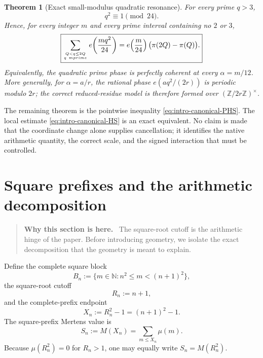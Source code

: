 \documentclass[11pt]{article}
\newtheorem{theorem}{Theorem}[section]
\theoremstyle{definition}
\theoremstyle{remark}
\newcommand{\1}{\mathbf{1}}
\newcommand{\N}{\mathbb{N}}
\newenvironment{motivation}
  {\begin{quote}\small\color{ovvogray}\textbf{Why this section is here.}\ }
  {\end{quote}}
\begin{document}
\begin{theorem}[Exact small-modulus quadratic resonance]
\label{thm:intro-prime-square-24}
For every prime $q>3$,
\[
 \boxed{q^2\equiv1\pmod{24}.}
\]
Hence, for every integer $m$ and every prime interval containing no $2$ or $3$,
\[
 \boxed{
 \sum_{Q<q\le2Q\atop q\ {
m prime}}
 e\!\left(\frac{m q^2}{24}\right)
 =e\!\left(\frac m{24}\right)
 \bigl(\pi(2Q)-\pi(Q)\bigr).
 }
\]
Equivalently, the quadratic prime phase is perfectly coherent at every
$\alpha=m/12$.  More generally, for $\alpha=a/r$, the rational phase
$e(aq^2/(2r))$ is periodic modulo $2r$; the correct reduced-residue model is therefore formed over $(\mathbb Z/2r\mathbb Z)^\times$.
\end{theorem}


The remaining theorem is the pointwise inequality \eqref{eq:intro-canonical-PHS}.  The local estimate \eqref{eq:intro-canonical-HS} is an exact equivalent.  No claim is made that the coordinate change alone supplies cancellation; it identifies the native arithmetic quantity, the correct scale, and the signed interaction that must be controlled.

\section{Square prefixes and the arithmetic decomposition}
\label{sec:arithmetic}

\begin{motivation}
The square-root cutoff is the arithmetic hinge of the paper.  Before introducing geometry, we isolate the exact decomposition that the geometry is meant to explain.
\end{motivation}

Define the complete square block
\begin{equation}
 B_n:=\{m\in\N:n^2\le m<(n+1)^2\},
 \label{eq:block}
\end{equation}
the square-root cutoff
\begin{equation}
 R_n:=n+1,
 \label{eq:Rn}
\end{equation}
and the complete-prefix endpoint
\begin{equation}
 X_n:=R_n^2-1=(n+1)^2-1.
 \label{eq:Xn}
\end{equation}
The square-prefix Mertens value is
\begin{equation}
 S_n:=M(X_n)=\sum_{m\le X_n}\mu(m).
 \label{eq:Sn}
\end{equation}
Because $\mu(R_n^2)=0$ for $R_n>1$, one may equally write $S_n=M(R_n^2)$.
\end{document}

